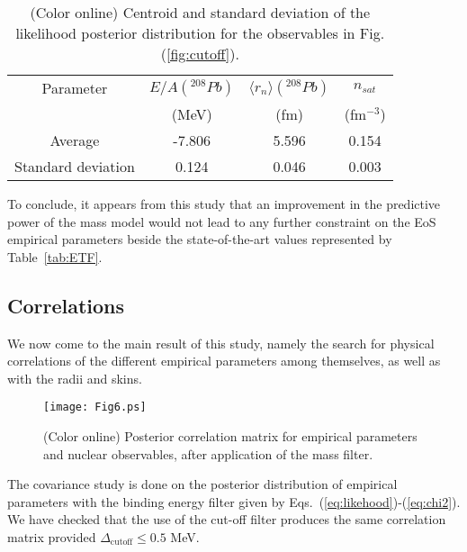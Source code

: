 \documentclass
[aps,prc,twocolumn,showpacs,showkeys,amsmath,floatfix,superscriptaddress]{revtex4}
\begin{document}
{{\begin{table}[tb]
\centering
\setlength{\tabcolsep}{2pt}
\renewcommand{\arraystretch}{1.2}
\begin{ruledtabular}
\begin{tabular}{cccc}
  Parameter & $E/A(^{208}Pb)$ & $\langle r_n \rangle(^{208}Pb)$ & $n_{sat}$  \\
  {} &  {(MeV)} & (fm) & (fm$^{-3}$) \\
 \hline
 Average & {-7.806} & {5.596} & {0.154}  \\
 \hline
Standard deviation  & {0.124} & {0.046} & {0.003} \\
\end{tabular}
\end{ruledtabular}
\caption{(Color online) Centroid and standard deviation of the likelihood posterior distribution for the observables in Fig. (\ref{fig:cutoff}).}
\label{tab:centroid}
\end{table}


 
To conclude, it appears from this study that an improvement in the predictive power of the mass model would not lead to any further constraint on the EoS empirical parameters beside the state-of-the-art values represented by Table~\ref{tab:ETF}.
 
 
\subsection{Correlations}

We now come to the main result of this study, namely the search for physical correlations of the different empirical parameters among themselves, as well as with the radii and skins.

\begin{figure*}[htbp]
    \begin{center}
   \hspace{-2 cm}
\texttt{[image: Fig6.ps]}
\vskip -1cm
      \caption{(Color online) Posterior correlation matrix for empirical parameters and nuclear observables, after application of the mass filter.  
      }\label{fig:corrmatrix}
      \end{center}
\end{figure*}


The covariance study is done on the posterior distribution of empirical parameters with the binding energy filter given by Eqs.~(\ref{eq:likehood})-(\ref{eq:chi2}).
We have checked that the use of the cut-off filter produces the same correlation matrix provided   $\Delta_\mathrm{cutoff}\le0.5$ MeV.

}}
\end{document}

